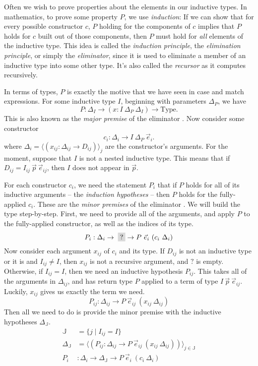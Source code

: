\documentclass{report}
\newcommand{\const}[1]{\text{#1}}
\newcommand{\hole}{\colorbox{gray!30}{?}}
\newcommand{\Type}{\const{Type}}
\begin{document}
Often we wish to prove properties about the elements in our inductive types. In mathematics, to prove some property $P$, we use \emph{induction}: If we can show that for every possible constructor $c$, $P$ holding for the components of $c$ implies that $P$ holds for $c$ built out of those components, then $P$ must hold for \emph{all} elements of the inductive type. This idea is called the \emph{induction principle}, the \emph{elimination principle}, or simply the \emph{eliminator}, since it is used to eliminate a member of an inductive type into some other type. It's also called the \emph{recursor} as it computes recursively.

In terms of types, $P$ is exactly the motive that we have seen in case and match expressions. For some inductive type $I$, beginning with parameters $\Delta_P$, we have $$P : \Delta_I \to (x : I ~ \Delta_P ~ \Delta_I) \to \Type.$$ This is also known as the \emph{major premise} of the eliminator \citep{inductive-families}. Now consider some constructor $$c_i : \Delta_{i} \to I ~ \Delta_P ~ \Vec{e}_i.$$ where $\Delta_i = \langle (x_{ij} : \Delta_{ij} \to D_{ij}) \rangle_j$ are the constructor's arguments. For the moment, suppose that $I$ is not a nested inductive type. This means that if $D_{ij} = I_{ij} ~ \Vec{p} ~ \Vec{e}_{ij}$, then $I$ does not appear in $\Vec{p}$.

For each constructor $c_i$, we need the statement $P_i$ that if $P$ holds for all of its inductive arguments -- the \emph{induction hypotheses} -- then $P$ holds for the fully-applied $c_i$. These are the \emph{minor premises} of the eliminator \citep{inductive-families}. We will build the type step-by-step. First, we need to provide all of the arguments, and apply $P$ to the fully-applied constructor, as well as the indices of its type. $$P_i: \Delta_i \to \; \hole \to P ~ \Vec{e}_i ~ (c_i ~ \Delta_i)$$ Now consider each argument $x_{ij}$ of $c_i$ and its type. If $D_{ij}$ is not an inductive type or it is and $I_{ij} \neq I$, then $x_{ij}$ is not a recursive argument, and $?$ is empty. Otherwise, if $I_{ij} = I$, then we need an inductive hypothesis $P_{ij}$. This takes all of the arguments in $\Delta_{ij}$, and has return type $P$ applied to a term of type $I ~ \Vec{p} ~ \Vec{e}_{ij}$. Luckily, $x_{ij}$ gives us exactly the term we need. $$P_{ij}: \Delta_{ij} \to P ~ \Vec{e}_{ij} ~ (x_{ij} ~ \Delta_{ij})$$ Then all we need to do is provide the minor premise with the inductive hypotheses $\Delta_{\mathbb{J}}$.
%
\begin{align*}
    \mathbb{J} &= \{j \mid I_{ij} = I\} \\
    \Delta_{\mathbb{J}} &= \langle (P_{ij} : \Delta_{ij} \to P ~ \Vec{e}_{ij} ~ (x_{ij} ~ \Delta_{ij})) \rangle_{j \in \mathbb{J}} \\
    P_i &: \Delta_i \to \Delta_{\mathbb{J}} \to P ~ \Vec{e}_i ~ (c_i ~ \Delta_i)
\end{align*}
\end{document}
